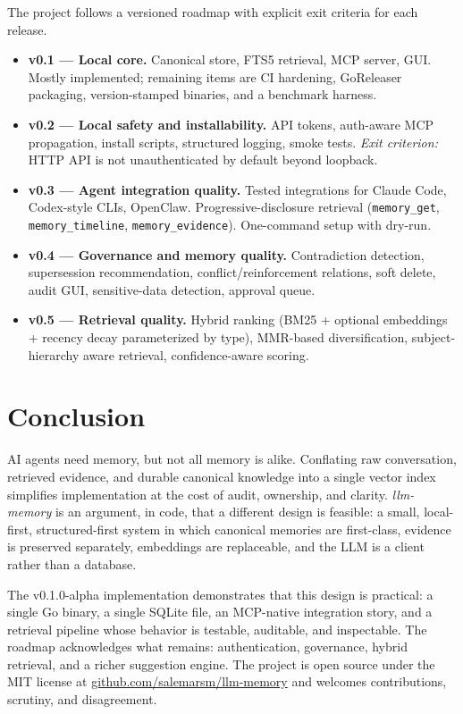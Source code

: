 \documentclass[11pt,a4paper]{article}
\begin{document}
The project follows a versioned roadmap with explicit exit criteria for each release.

\begin{itemize}
 \item \textbf{v0.1 --- Local core.} Canonical store, FTS5 retrieval, MCP server, GUI. Mostly implemented; remaining items are CI hardening, GoReleaser packaging, version-stamped binaries, and a benchmark harness.
 \item \textbf{v0.2 --- Local safety and installability.} API tokens, auth-aware MCP propagation, install scripts, structured logging, smoke tests. \emph{Exit criterion:} HTTP API is not unauthenticated by default beyond loopback.
 \item \textbf{v0.3 --- Agent integration quality.} Tested integrations for Claude Code, Codex-style CLIs, OpenClaw. Progressive-disclosure retrieval (\texttt{memory\_get}, \texttt{memory\_timeline}, \texttt{memory\_evidence}). One-command setup with dry-run.
 \item \textbf{v0.4 --- Governance and memory quality.} Contradiction detection, supersession recommendation, conflict/reinforcement relations, soft delete, audit GUI, sensitive-data detection, approval queue.
 \item \textbf{v0.5 --- Retrieval quality.} Hybrid ranking (BM25 + optional embeddings + recency decay parameterized by type), MMR-based diversification, subject-hierarchy aware retrieval, confidence-aware scoring.
\end{itemize}

\section{Conclusion}

AI agents need memory, but not all memory is alike. Conflating raw conversation, retrieved evidence, and durable canonical knowledge into a single vector index simplifies implementation at the cost of audit, ownership, and clarity. \textit{llm-memory} is an argument, in code, that a different design is feasible: a small, local-first, structured-first system in which canonical memories are first-class, evidence is preserved separately, embeddings are replaceable, and the LLM is a client rather than a database.

The v0.1.0-alpha implementation demonstrates that this design is practical: a single Go binary, a single SQLite file, an MCP-native integration story, and a retrieval pipeline whose behavior is testable, auditable, and inspectable. The roadmap acknowledges what remains: authentication, governance, hybrid retrieval, and a richer suggestion engine. The project is open source under the MIT license at \href{https://github.com/salemarsm/llm-memory}{github.com/salemarsm/llm-memory} and welcomes contributions, scrutiny, and disagreement.
\end{document}
